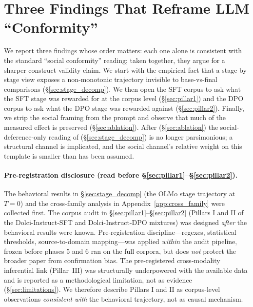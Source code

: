 \documentclass[11pt]{article}
\begin{document}
\section{Three Findings That Reframe LLM ``Conformity''}
\label{sec:results}

\noindent We report three findings whose order matters: each one alone is consistent with the standard ``social conformity'' reading; taken together, they argue for a sharper construct-validity claim. We start with the empirical fact that a stage-by-stage view exposes a non-monotonic trajectory invisible to base-vs-final comparisons (\S\ref{sec:stage_decomp}). We then open the SFT corpus to ask what the SFT stage was rewarded for at the corpus level (\S\ref{sec:pillar1}) and the DPO corpus to ask what the DPO stage was rewarded against (\S\ref{sec:pillar2}). Finally, we strip the social framing from the prompt and observe that much of the measured effect is preserved (\S\ref{sec:ablation}). After (\S\ref{sec:ablation}) the social-deference-only reading of (\S\ref{sec:stage_decomp}) is no longer parsimonious; a structural channel is implicated, and the social channel's relative weight on this template is smaller than has been assumed.

\paragraph{Pre-registration disclosure (read before \S\ref{sec:pillar1}--\S\ref{sec:pillar2}).}
The behavioral results in \S\ref{sec:stage_decomp} (the OLMo stage trajectory at $T{=}0$) and the cross-family analysis in Appendix~\ref{app:cross_family} were collected first. The corpus audit in \S\ref{sec:pillar1}--\S\ref{sec:pillar2} (Pillars I and II of the Dolci-Instruct-SFT and Dolci-Instruct-DPO mixtures) was designed \emph{after} the behavioral results were known. Pre-registration discipline---regexes, statistical thresholds, source-to-domain mapping---was applied \emph{within} the audit pipeline, frozen before phases 5 and 6 ran on the full corpora, but does \emph{not} protect the broader paper from confirmation bias. The pre-registered cross-modality inferential link (Pillar~III) was structurally underpowered with the available data and is reported as a methodological limitation, not as evidence (\S\ref{sec:limitations}). We therefore describe Pillars I and II as corpus-level observations \emph{consistent with} the behavioral trajectory, not as causal mechanism.
\end{document}

